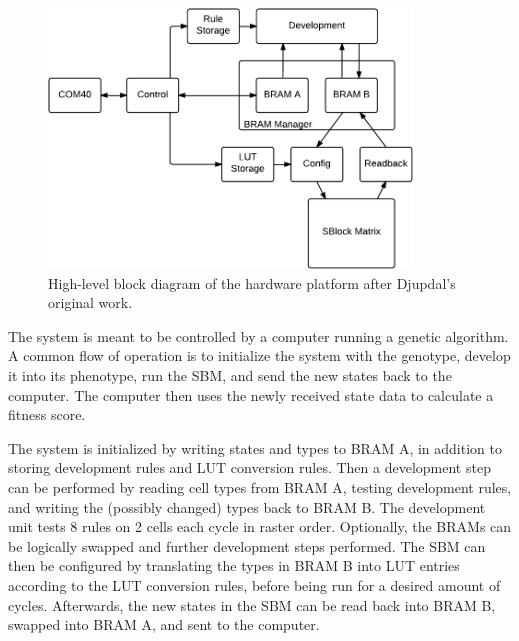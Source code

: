 \begin{figure}[!ht]
    \centering
    \includegraphics[width=0.86\textwidth]{figures/overview-djupdal}
    \caption[Djupdal's hardware design.]{
        High-level block diagram of the hardware platform after Djupdal's original work.
    }
    \label{fig:overview-djupdal}
\end{figure}

The system is meant to be controlled by a computer running a genetic algorithm.
A common flow of operation is to initialize the system with the genotype, develop it into its phenotype, run the SBM, and send the new states back to the computer.
The computer then uses the newly received state data to calculate a fitness score.

The system is initialized by writing states and types to BRAM A, in addition to storing development rules and LUT conversion rules.
Then a development step can be performed by reading cell types from BRAM A\footnotemark, testing development rules, and writing the (possibly changed) types back to BRAM B.
The development unit tests 8 rules on 2 cells each cycle in raster order.
Optionally, the BRAMs can be logically swapped and further development steps performed.
The SBM can then be configured by translating the types in BRAM B into LUT entries according to the LUT conversion rules, before being run for a desired amount of cycles.
Afterwards, the new states in the SBM can be read back into BRAM B, swapped into BRAM A, and sent to the computer.

